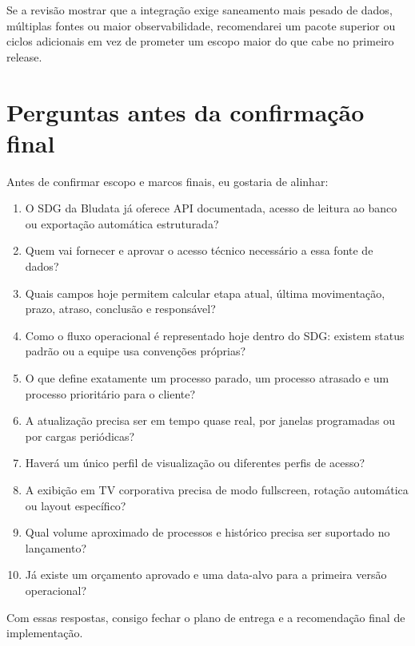 \documentclass[11pt,a4paper]{article}
\begin{document}
Se a revisão mostrar que a integração exige saneamento mais pesado de dados, múltiplas fontes ou maior observabilidade, recomendarei um pacote superior ou ciclos adicionais em vez de prometer um escopo maior do que cabe no primeiro release.\par

\section*{Perguntas antes da confirmação final}

Antes de confirmar escopo e marcos finais, eu gostaria de alinhar:\par

\begin{enumerate}
\item O SDG da Bludata já oferece API documentada, acesso de leitura ao banco ou exportação automática estruturada?
\item Quem vai fornecer e aprovar o acesso técnico necessário a essa fonte de dados?
\item Quais campos hoje permitem calcular etapa atual, última movimentação, prazo, atraso, conclusão e responsável?
\item Como o fluxo operacional é representado hoje dentro do SDG: existem status padrão ou a equipe usa convenções próprias?
\item O que define exatamente um processo parado, um processo atrasado e um processo prioritário para o cliente?
\item A atualização precisa ser em tempo quase real, por janelas programadas ou por cargas periódicas?
\item Haverá um único perfil de visualização ou diferentes perfis de acesso?
\item A exibição em TV corporativa precisa de modo fullscreen, rotação automática ou layout específico?
\item Qual volume aproximado de processos e histórico precisa ser suportado no lançamento?
\item Já existe um orçamento aprovado e uma data-alvo para a primeira versão operacional?
\end{enumerate}

Com essas respostas, consigo fechar o plano de entrega e a recomendação final de implementação.\par
\end{document}
